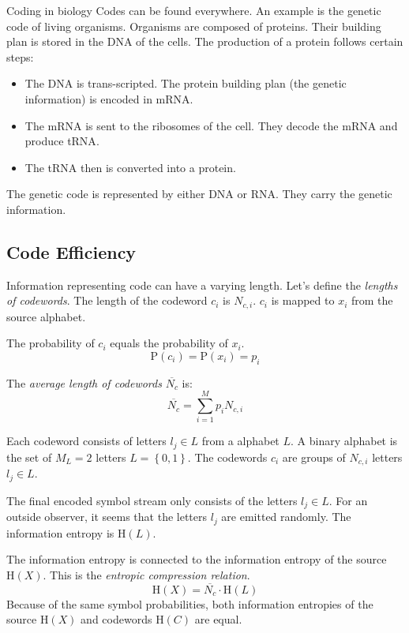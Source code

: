 \begin{refsection}
\begin{excursus}{Coding in biology}
	Codes can be found everywhere. An example is the genetic code of living organisms. Organisms are composed of proteins. Their building plan is stored in the \ac{DNA} of the cells. The production of a protein follows certain steps:
	\begin{itemize}
		\item The \ac{DNA} is trans-scripted. The protein building plan (the genetic information) is encoded in \ac{mRNA}.
		\item The \ac{mRNA} is sent to the ribosomes of the cell. They decode the \ac{mRNA} and produce \ac{tRNA}.
		\item The \ac{tRNA} then is converted into a protein.
	\end{itemize}
	The genetic code is represented by either \ac{DNA} or \ac{RNA}. They carry the genetic information.
\end{excursus}

\subsection{Code Efficiency}

Information representing code can have a varying length. Let's define the \emph{lengths of codewords}. The length of the codeword $c_i$ is $N_{c,i}$. $c_i$ is mapped to $x_i$ from the source alphabet.

The probability of $c_i$ equals the probability of $x_i$.
\begin{equation}
	\mathrm{P}\left(c_i\right) = \mathrm{P}\left(x_i\right) = p_i
\end{equation}

The \emph{average length of codewords} $\overline{N_c}$ is:
\begin{equation}
	\overline{N_c} = \sum\limits_{i=1}^{M} p_i N_{c,i}
\end{equation}

Each codeword consists of letters $l_j \in L$ from a alphabet $L$. A binary alphabet is the set of $M_L = 2$ letters $L = \left\{0, 1\right\}$. The codewords $c_i$ are groups of $N_{c,i}$ letters $l_j \in L$.

The final encoded symbol stream only consists of the letters $l_j \in L$. For an outside observer, it seems that the letters $l_j$ are emitted randomly. The information entropy is $\mathrm{H}\left(L\right)$.

The information entropy is connected to the information entropy of the source $\mathrm{H}\left(X\right)$. This is the \emph{entropic compression relation}.
\begin{equation}
	\mathrm{H}\left(X\right) = \overline{N_c} \cdot \mathrm{H}\left(L\right)
\end{equation}
Because of the same symbol probabilities, both information entropies of the source $\mathrm{H}\left(X\right)$ and codewords $\mathrm{H}\left(C\right)$ are equal.


\end{refsection}
